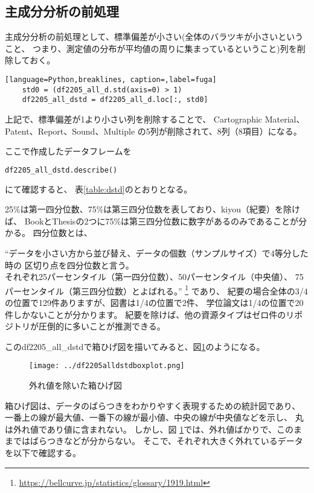 \documentclass[submit,noauthor]{ono}
\begin{document}
\subsection{主成分分析の前処理}
主成分分析の前処理として、標準偏差が小さい(全体のバラツキが小さいということ、
つまり、測定値の分布が平均値の周りに集まっているということ)列を削除しておく。

\begin{lstlisting}[language=Python,breaklines, caption=,label=fuga]
	std0 = (df2205_all_d.std(axis=0) > 1)
	df2205_all_dstd = df2205_all_d.loc[:, std0]
\end{lstlisting}

上記で、標準偏差が1より小さい列を削除することで、
Cartographic Material、Patent、Report、Sound、Multiple
の5列が削除されて、8列（8項目）になる。

ここで作成したデータフレームを

\begin{lstlisting}[language=Python,breaklines]
	df2205_all_dstd.describe()
\end{lstlisting}

にて確認すると、
表\ref{table:dstd}のとおりとなる。

25\%は第一四分位数、75\%は第三四分位数を表しており、kiyou（紀要）を除けば、
BookとThesisの2つに75\%は第三四分位数に数字があるのみであることが分かる。
四分位数とは、

“データを小さい方から並び替え、データの個数（サンプルサイズ）で4等分した時の
区切り点を四分位数と言う。\\
それぞれ25パーセンタイル（第一四分位数）、50パーセンタイル（中央値）、
75パーセンタイル（第三四分位数）とよばれる。”
\footnote{\url{https://bellcurve.jp/statistics/glossary/1919.html}}
であり、
紀要の場合全体の3/4の位置で129件ありますが、図書は1/4の位置で2件、
学位論文は1/4の位置で20件しかないことが分かります。
紀要を除けば、他の資源タイプはゼロ件のリポジトリが圧倒的に多いことが推測できる。


このdf2205\_all\_dstdで箱ひげ図を描いてみると、図\ref{fig:box1}のようになる。

\begin{figure}[h]
	\texttt{[image: ../df2205alldstdboxplot.png]}
	\caption{外れ値を除いた箱ひげ図}
	\label{fig:box1}
\end{figure}

箱ひげ図は、データのばらつきをわかりやすく表現するための統計図であり、
一番上の線が最大値、一番下の線が最小値、中央の線が中央値などを示し、
丸は外れ値であり値に含まれない。
しかし、図 \ref{fig:box1}では、外れ値ばかりで、このままではばらつきなどが分からない。
そこで、それぞれ大きく外れているデータを以下で確認する。
\end{document}
